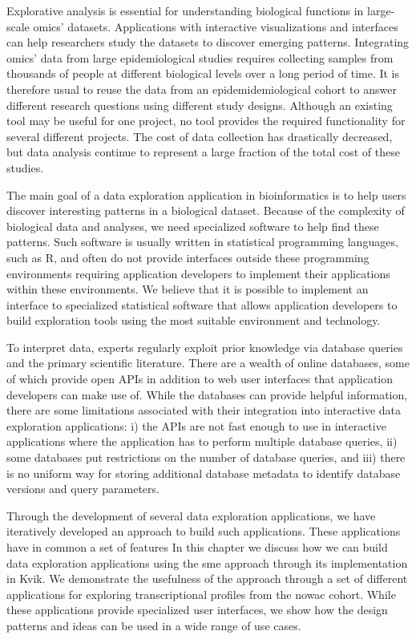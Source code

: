 Explorative analysis is essential for understanding biological functions in
large-scale omics' datasets. Applications with interactive visualizations and
interfaces can help researchers study the datasets to discover emerging
patterns.  Integrating omics' data from large epidemiological studies requires
collecting samples from thousands of people at different biological levels over
a long period of time. It is therefore usual to reuse the data from an
epidemidemiological cohort to answer different research questions using
different study designs. Although an existing tool may be useful for one
project, no tool provides the required functionality for several different
projects. The cost of data collection has drastically decreased, but data
analysis continue to represent a large fraction of the total cost of these
studies.\cite{sboner2011real}

The main goal of a data exploration application in bioinformatics is to help
users discover interesting patterns in a biological dataset. Because of the
complexity of biological data and analyses, we need specialized software to help
find these patterns. Such software is usually written in statistical programming
languages, such as R, and often do not provide interfaces outside these
programming environments requiring application developers to implement their
applications within these environments. We believe that it is possible to
implement an interface to specialized statistical software that allows
application developers to build exploration tools using the most suitable
environment and technology. 

To interpret data, experts regularly exploit prior knowledge via database
queries and the primary scientific literature. There are a wealth of online
databases, some of which provide open APIs in addition to web user interfaces
that application developers can make use of. While the databases can provide
helpful information, there are some limitations associated with their
integration into interactive data exploration applications: 
i) the APIs are not fast enough to use in interactive applications where the
application has to perform multiple database queries, 
ii) some databases put restrictions on the number of database queries, and 
iii) there is no uniform way for storing additional database metadata to
identify database versions and query parameters. 

Through the development of several data exploration applications, we have
iteratively developed an approach to build such applications. These applications
have in common a set of features In this chapter we discuss how we can build
data exploration applications using the \gls{sme} approach through its
implementation in Kvik. We demonstrate the usefulness of the approach through a
set of different applications for exploring transcriptional profiles from the
\gls{nowac} cohort. While these applications provide specialized user
interfaces, we show how the design patterns and ideas can be used in a wide
range of use cases. 

